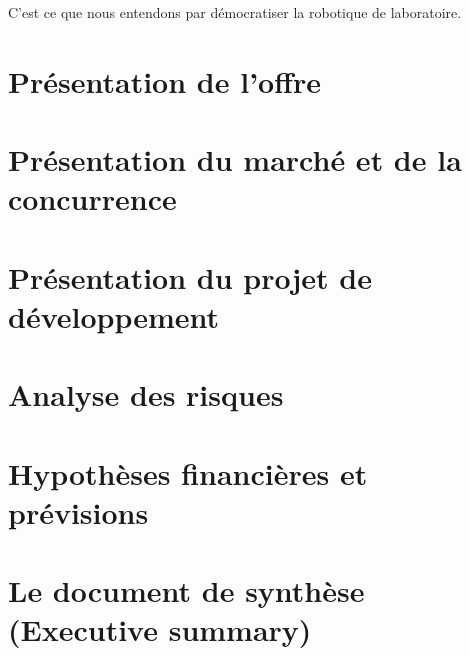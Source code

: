\documentclass[a4paper,12pt]{report}
\begin{document}
C'est ce que nous entendons par \og démocratiser la robotique de laboratoire\fg{}.

\section{Présentation de l'offre}
\section{Présentation du marché et de la concurrence}
\section{Présentation du projet de développement}
\section{Analyse des risques}
\section{Hypothèses financières et prévisions}
\section{Le document de synthèse (Executive summary)}
\end{document}
